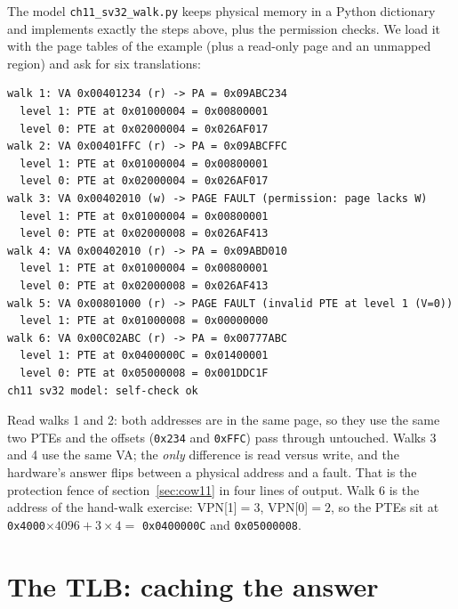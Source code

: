 \begin{example}
The model \texttt{ch11\_sv32\_walk.py} keeps physical memory in a Python
dictionary and implements exactly the steps above, plus the permission
checks. We load it with the page tables of the example (plus a read-only
page and an unmapped region) and ask for six translations:

\begin{lstlisting}[language={},label={lst:walk11},caption={\texttt{python3 ch11\_sv32\_walk.py}. Walk 1 reproduces the hand
calculation (PTE \texttt{0x026AF017} is PPN \texttt{0x9ABC} shifted left 10 plus flags V,R,W,U). Walk 3 stores to a read-only page; walk 5 reaches an empty top-level entry.}]
walk 1: VA 0x00401234 (r) -> PA = 0x09ABC234
  level 1: PTE at 0x01000004 = 0x00800001
  level 0: PTE at 0x02000004 = 0x026AF017
walk 2: VA 0x00401FFC (r) -> PA = 0x09ABCFFC
  level 1: PTE at 0x01000004 = 0x00800001
  level 0: PTE at 0x02000004 = 0x026AF017
walk 3: VA 0x00402010 (w) -> PAGE FAULT (permission: page lacks W)
  level 1: PTE at 0x01000004 = 0x00800001
  level 0: PTE at 0x02000008 = 0x026AF413
walk 4: VA 0x00402010 (r) -> PA = 0x09ABD010
  level 1: PTE at 0x01000004 = 0x00800001
  level 0: PTE at 0x02000008 = 0x026AF413
walk 5: VA 0x00801000 (r) -> PAGE FAULT (invalid PTE at level 1 (V=0))
  level 1: PTE at 0x01000008 = 0x00000000
walk 6: VA 0x00C02ABC (r) -> PA = 0x00777ABC
  level 1: PTE at 0x0400000C = 0x01400001
  level 0: PTE at 0x05000008 = 0x001DDC1F
ch11 sv32 model: self-check ok
\end{lstlisting}

Read walks 1 and 2: both addresses are in the same page, so they use the
same two PTEs and the offsets (\texttt{0x234} and \texttt{0xFFC}) pass through
untouched. Walks 3 and 4 use the same VA; the \emph{only} difference is
read versus write, and the hardware's answer flips between a physical
address and a fault. That is the protection fence of
section~\ref{sec:cow11} in four lines of output. Walk 6 is the address of the
hand-walk exercise: VPN[1]\(=3\), VPN[0]\(=2\), so the PTEs sit at
\texttt{0x4000}\(\times4096+3\times4=\) \texttt{0x0400000C} and
\texttt{0x05000008}.
\end{example}

\section{The TLB: caching the answer}
\label{sec:tlb11}

